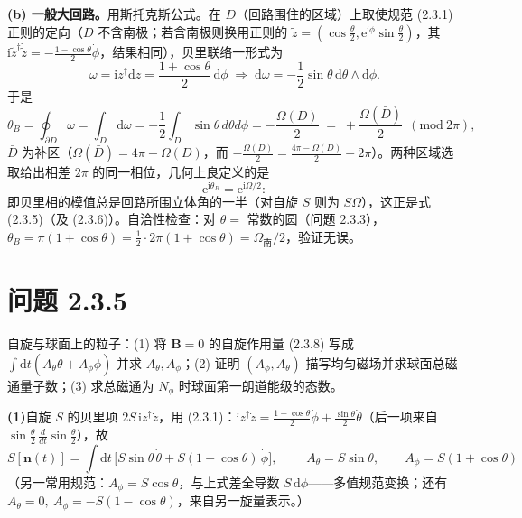 \textbf{(b) 一般大回路。}用斯托克斯公式。在 $D$（回路围住的区域）上取使规范 (2.3.1) 正则的定向（$D$ 不含南极；若含南极则换用正则的 $\tilde z=(\cos\frac\theta2,\mathrm{e}^{\mathrm{i}\phi}\sin\frac\theta2)$，其 $\mathrm{i}\tilde z^\dagger\dot{\tilde z}=-\frac{1-\cos\theta}2\dot\phi$，结果相同），贝里联络一形式为
\begin{equation*}
\omega=\mathrm{i}z^\dagger\mathrm{d}z=\frac{1+\cos\theta}2\,\mathrm{d}\phi
\;\Longrightarrow\;
\mathrm{d}\omega=-\frac12\sin\theta\,\mathrm{d}\theta\wedge\mathrm{d}\phi .
\end{equation*}
于是
\begin{equation*}
\theta_B=\oint_{\partial D}\omega=\int_D\mathrm{d}\omega=-\frac12\int_D\sin\theta\,d\theta d\phi=-\frac{\Omega(D)}2
\;=\;+\frac{\Omega(\bar D)}2\ \ (\mathrm{mod}\ 2\pi),
\end{equation*}
$\bar D$ 为补区（$\Omega(\bar D)=4\pi-\Omega(D)$，而 $-\frac{\Omega(D)}2=\frac{4\pi-\Omega(D)}2-2\pi$）。两种区域选取给出相差 $2\pi$ 的同一相位，几何上良定义的是
\begin{equation*}
\mathrm{e}^{\mathrm{i}\theta_B}=\mathrm{e}^{\mathrm{i}\Omega/2}:
\end{equation*}
即贝里相的模值总是回路所围立体角的一半（对自旋 $S$ 则为 $S\Omega$），这正是式 (2.3.5)（及 (2.3.6)）。自洽性检查：对 $\theta=$ 常数的圆（问题 2.3.3），$\theta_B=\pi(1+\cos\theta)=\frac12\cdot2\pi(1+\cos\theta)=\Omega_{\text{南}}/2$，验证无误。

\section*{问题 2.3.5}
\begin{problem}
自旋与球面上的粒子：(1) 将 $\pmb B=0$ 的自旋作用量 (2.3.8) 写成 $\int\mathrm{d}t(A_\theta\dot\theta+A_\phi\dot\phi)$ 并求 $A_\theta,A_\phi$；(2) 证明 $(A_\phi,A_\theta)$ 描写均匀磁场并求球面总磁通量子数；(3) 求总磁通为 $N_\phi$ 时球面第一朗道能级的态数。
\end{problem}
\solution
\textbf{(1)}自旋 $S$ 的贝里项 $2S\,\mathrm{i}z^\dagger\dot z$，用 (2.3.1)：$\mathrm{i}z^\dagger\dot z=\frac{1+\cos\theta}2\dot\phi+\frac{\sin\theta}2\dot\theta$（后一项来自 $\sin\frac\theta2\,\frac{d}{dt}\sin\frac\theta2$），故
\begin{equation*}
S[\pmb n(t)]=\int\mathrm{d}t\,\Big[S\sin\theta\,\dot\theta+S(1+\cos\theta)\,\dot\phi\Big],
\qquad
\boxed{\;A_\theta=S\sin\theta,\qquad A_\phi=S(1+\cos\theta)\;}
\end{equation*}
（另一常用规范：$A_\phi=S\cos\theta$，与上式差全导数 $S\,\mathrm{d}\phi$——多值规范变换；还有 $A_\theta=0,\ A_\phi=-S(1-\cos\theta)$，来自另一旋量表示。）

